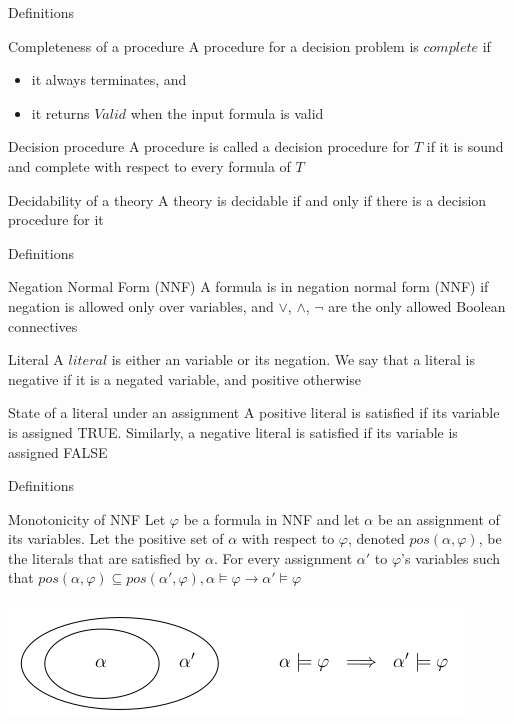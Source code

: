 \documentclass[mathserif]{beamer}
\begin{document}
\begin{frame}{Definitions}
\begin{block}{Completeness of a procedure}
A procedure for a decision problem is $complete$ if
\begin{itemize}
\item it always terminates, and
\item it returns $Valid$ when the input formula is valid
\end{itemize}
\end{block}
\begin{block}{Decision procedure}
A procedure is called a decision procedure for $T$ if it is sound and complete with respect to every formula of $T$
\end{block}
\begin{block}{Decidability of a theory}
A theory is decidable if and only if there is a decision procedure for it
\end{block}
\end{frame}

\begin{frame}{Definitions}
\begin{block}{Negation Normal Form (NNF)}
A formula is in negation normal form (NNF) if negation is allowed only over variables, and $\vee$, $\wedge$, $\lnot$ are the only allowed Boolean connectives
\end{block}
\begin{block}{Literal}
A $literal$ is either an variable or its negation. We say that a literal is negative if it is a negated variable, and positive otherwise
\end{block}
\begin{block}{State of a literal under an assignment}
A positive literal is satisfied if its variable is assigned TRUE. Similarly, a negative literal is satisfied if its variable is assigned FALSE
\end{block}
\end{frame}

\begin{frame}{Definitions}
\begin{block}{Monotonicity of NNF}
Let $\varphi$ be a formula in NNF and let $\alpha$ be an assignment of its variables.
Let the positive set of $\alpha$ with respect to $\varphi$, denoted $pos(\alpha, \varphi)$, be the literals that are satisfied by $\alpha$.
For every assignment $\alpha'$ to $\varphi$'s variables such that $pos(\alpha, \varphi) \subseteq pos(\alpha', \varphi), \alpha \models \varphi \rightarrow \alpha' \models \varphi$
\end{block}
\includegraphics[scale=0.5]{monotonicity.png}
\end{frame}
\end{document}
